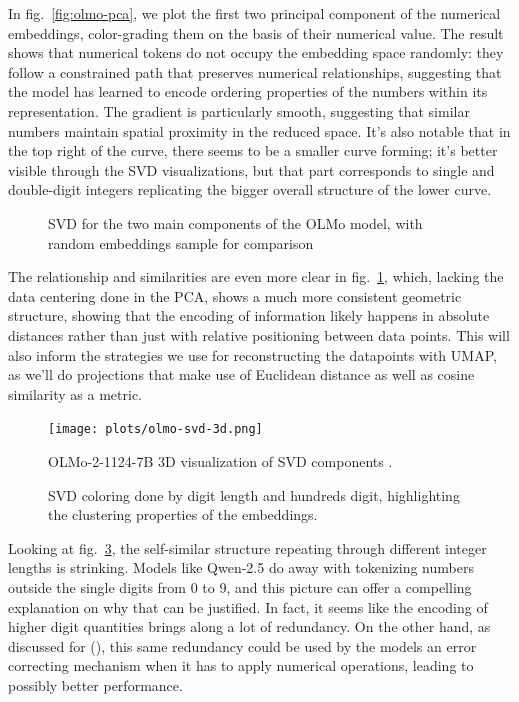 \documentclass[
  a4paper, twoside, 10pt, titlepage]{book}
\makeatletter
\newcommand*\pandocbounded[1]{%
  \sbox\pandoc@box{#1}%
  \Gscale@div\@tempa{\textheight}{\dimexpr\ht\pandoc@box+\dp\pandoc@box\relax}%
  \Gscale@div\@tempb{\linewidth}{\wd\pandoc@box}%
  \ifdim\@tempb\p@<\@tempa\p@\let\@tempa\@tempb\fi%
  \ifdim\@tempa\p@<\p@\scalebox{\@tempa}{\usebox\pandoc@box}%
  \else\usebox{\pandoc@box}%
  \fi%
}
\makeatother
\begin{document}
In fig.~\ref{fig:olmo-pca}, we plot the first two principal component of
the numerical embeddings, color-grading them on the basis of their
numerical value. The result shows that numerical tokens do not occupy
the embedding space randomly: they follow a constrained path that
preserves numerical relationships, suggesting that the model has learned
to encode ordering properties of the numbers within its representation.
The gradient is particularly smooth, suggesting that similar numbers
maintain spatial proximity in the reduced space. It's also notable that
in the top right of the curve, there seems to be a smaller curve
forming; it's better visible through the SVD visualizations, but that
part corresponds to single and double-digit integers replicating the
bigger overall structure of the lower curve.

\begin{figure}
\centering
\pandocbounded{}
\caption{SVD for the two main components of the OLMo model, with random
embeddings sample for comparison}\label{fig:olmo-svd}
\end{figure}

The relationship and similarities are even more clear in
fig.~\ref{fig:olmo-svd}, which, lacking the data centering done in the
PCA, shows a much more consistent geometric structure, showing that the
encoding of information likely happens in absolute distances rather than
just with relative positioning between data points. This will also
inform the strategies we use for reconstructing the datapoints with
UMAP, as we'll do projections that make use of Euclidean distance as
well as cosine similarity as a metric.

\begin{figure}
\centering
\texttt{[image: plots/olmo-svd-3d.png]}
\caption{OLMo-2-1124-7B 3D visualization of SVD components
.}\label{fig:olmo-svd-3d}
\end{figure}

\begin{figure}
\centering
\pandocbounded{}
\caption{SVD coloring done by digit length and hundreds digit,
highlighting the clustering properties of the
embeddings.}\label{fig:olmo-svd-digits}
\end{figure}

Looking at fig.~\ref{fig:olmo-svd-digits}, the self-similar structure
repeating through different integer lengths is strinking. Models like
Qwen-2.5 do away with tokenizing numbers outside the single digits from
0 to 9, and this picture can offer a compelling explanation on why that
can be justified. In fact, it seems like the encoding of higher digit
quantities brings along a lot of redundancy. On the other hand, as
discussed for (), this same redundancy could be used by the models an error
correcting mechanism when it has to apply numerical operations, leading
to possibly better performance.
\end{document}
